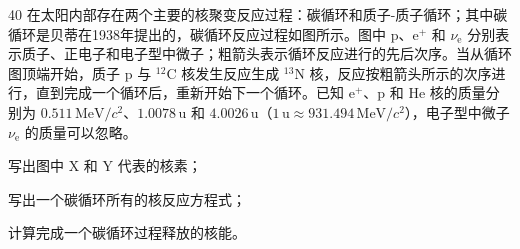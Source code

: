 \begin{problem}[第32届全国中学生物理竞赛复赛][核聚变循环]{40}
    在太阳内部存在两个主要的核聚变反应过程：碳循环和质子-质子循环；其中碳循环是贝蒂在1938年提出的，碳循环反应过程如图所示。图中 $\mathrm{p}$、$\mathrm{e}^{+}$ 和 $\nu_{\mathrm{e}}$ 分别表示质子、正电子和电子型中微子；粗箭头表示循环反应进行的先后次序。当从循环图顶端开始，质子 $\mathrm{p}$ 与 $^{12}\mathrm{C}$ 核发生反应生成 $^{13}\mathrm{N}$ 核，反应按粗箭头所示的次序进行，直到完成一个循环后，重新开始下一个循环。已知 $\mathrm{e}^{+}$、$\mathrm{p}$ 和 $\mathrm{He}$ 核的质量分别为 $0.511\,\mathrm{MeV}/c^{2}$、$1.0078\,\mathrm{u}$ 和 $4.0026\,\mathrm{u}$（$1\,\mathrm{u}\approx 931.494\,\mathrm{MeV}/c^{2}$），电子型中微子 $\nu_{\mathrm{e}}$ 的质量可以忽略。
    \begin{subproblem}
        写出图中 X 和 Y 代表的核素；
    \end{subproblem}
    \begin{subproblem}
        写出一个碳循环所有的核反应方程式；
    \end{subproblem}
    \begin{subproblem}
        计算完成一个碳循环过程释放的核能。
    \end{subproblem}
\end{problem}